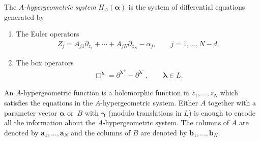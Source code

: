 {\samepage
The {\it $A$-hypergeometric system} $H_{A}(\bm{\alpha})$ is the system of differential equations generated by
\begin{enumerate}\itemsep=0pt
\item The Euler operators
\begin{gather*}%
Z_j=A_{j1}\partial_{z_1}+\cdots+A_{jN}\partial_{z_N}-\alpha_j,\qquad j=1,\dots,N-d.
\end{gather*}
\item The box operators
\begin{gather*}%
\Box^{\bm{\lambda}}=\partial^{\bm{\lambda}^+}-\partial^{\bm{\lambda}^-},\qquad
\bm{\lambda}\in L.
\end{gather*}
\end{enumerate}}

An $A$-hypergeometric function is a holomorphic
function in $z_1,\dots,z_N$ which satisfies the equations in the $A$-hypergeometric system. Either $A$ together with a parameter vector $\bm{\alpha}$ or~$B$
with $\bm{\gamma}$ (modulo translations in $L$) is enough to encode all the information about the $A$-hypergeometric system. The columns of $A$ are denoted by $\bm{a}_1,\dots,\bm{a}_N$ and the columns of $B$ are denoted by $\bm{b}_1,\dots,\bm{b}_N$.
